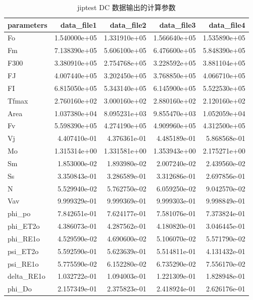 \documentclass[]{krantz}
\theoremstyle{definition}
\theoremstyle{definition}
\theoremstyle{definition}
\theoremstyle{remark}
\begin{document}
\begin{longtable}[t]{lrrrr}
\caption{\label{tab:dcjipres}jiptest DC 数据输出的计算参数}\\
\toprule
parameters & data\_file1 & data\_file2 & data\_file3 & data\_file4\\
\midrule
Fo & 1.540000e+05 & 1.331910e+05 & 1.566640e+05 & 1.535890e+05\\
Fm & 7.138390e+05 & 5.606100e+05 & 6.476600e+05 & 5.848390e+05\\
F300 & 3.380910e+05 & 2.754768e+05 & 3.228592e+05 & 3.881104e+05\\
FJ & 4.007440e+05 & 3.202450e+05 & 3.768850e+05 & 4.066710e+05\\
FI & 6.815050e+05 & 5.343140e+05 & 6.145900e+05 & 5.522530e+05\\
\addlinespace
Tfmax & 2.760160e+02 & 3.000160e+02 & 2.880160e+02 & 2.120160e+02\\
Area & 1.037380e+04 & 8.095231e+03 & 9.855470e+03 & 1.052059e+04\\
Fv & 5.598390e+05 & 4.274190e+05 & 4.909960e+05 & 4.312500e+05\\
Vj & 4.407410e-01 & 4.376361e-01 & 4.485189e-01 & 5.868568e-01\\
Mo & 1.315314e+00 & 1.331581e+00 & 1.353943e+00 & 2.175271e+00\\
\addlinespace
Sm & 1.853000e-02 & 1.893980e-02 & 2.007240e-02 & 2.439560e-02\\
Ss & 3.350843e-01 & 3.286589e-01 & 3.312686e-01 & 2.697856e-01\\
N & 5.529940e-02 & 5.762750e-02 & 6.059250e-02 & 9.042570e-02\\
Vav & 9.999329e-01 & 9.999369e-01 & 9.999303e-01 & 9.998849e-01\\
phi\_po & 7.842651e-01 & 7.624177e-01 & 7.581076e-01 & 7.373824e-01\\
\addlinespace
phi\_ET2o & 4.386073e-01 & 4.287562e-01 & 4.180820e-01 & 3.046445e-01\\
phi\_RE1o & 4.529590e-02 & 4.690600e-02 & 5.106070e-02 & 5.571790e-02\\
psi\_ET2o & 5.592590e-01 & 5.623639e-01 & 5.514811e-01 & 4.131432e-01\\
psi\_RE1o & 5.775590e-02 & 6.152280e-02 & 6.735290e-02 & 7.556170e-02\\
delta\_RE1o & 1.032722e-01 & 1.094003e-01 & 1.221309e-01 & 1.828948e-01\\
\addlinespace
phi\_Do & 2.157349e-01 & 2.375823e-01 & 2.418924e-01 & 2.626176e-01\\

\end{longtable}
\end{document}

